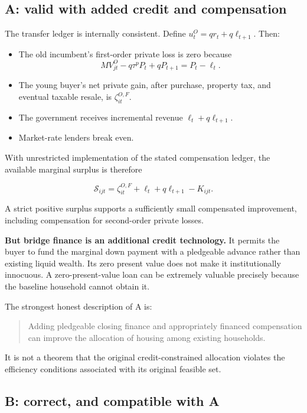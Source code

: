 \documentclass[11pt,letterpaper]{article}
\providecommand{\tightlist}{\setlength{\itemsep}{0.25em}\setlength{\parskip}{0pt}}
\begin{document}
\subsection{A: valid with added credit and
compensation}\label{a-valid-with-added-credit-and-compensation}

The transfer ledger is internally consistent. Define \(u_t^O=qr_t+q\ell_{t+1}\). Then:

\begin{itemize}
\tightlist
\item
  The old incumbent's first-order private loss is zero because \[
  MV_{jt}^{O}-q\tau^pP_t+qP_{t+1}=P_t-\ell_t.
  \]
\item
  The young buyer's net private gain, after purchase, property tax, and eventual taxable
  resale, is \(\zeta_{it}^{O,F}\).
\item
  The government receives incremental revenue \(\ell_t+q\ell_{t+1}\).
\item
  Market-rate lenders break even.
\end{itemize}

With unrestricted implementation of the stated compensation ledger, the available marginal
surplus is therefore

\[
\mathcal S_{ijt}
=\zeta_{it}^{O,F}+\ell_t+q\ell_{t+1}-K_{ijt}.
\]

A strict positive surplus supports a sufficiently small compensated improvement, including
compensation for second-order private losses.

\textbf{But bridge finance is an additional credit technology.} It permits the buyer to
fund the marginal down payment with a pledgeable advance rather than existing liquid
wealth. Its zero present value does not make it institutionally innocuous. A
zero-present-value loan can be extremely valuable precisely because the baseline household
cannot obtain it.

The strongest honest description of A is:

\begin{quote}
Adding pledgeable closing finance and appropriately financed compensation can improve the
allocation of housing among existing households.
\end{quote}

It is not a theorem that the original credit-constrained allocation violates the
efficiency conditions associated with its original feasible set.

\subsection{B: correct, and compatible with A}\label{b-correct-and-compatible-with-a}
\end{document}
